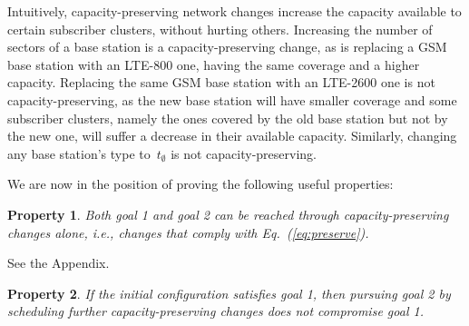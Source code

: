 \documentclass[10pt,journal,cspaper,compsoc]{IEEEtran}
\newcommand{\Eq}[1]{Eq.~(\ref{eq:#1})}
\newtheorem{property}{Property}
\begin{document}
Intuitively, capacity-preserving network changes increase the capacity available to certain subscriber clusters,
without hurting others. Increasing the number of sectors of a base station is a capacity-preserving change, as is
replacing a GSM base station with an LTE-800 one, having the same coverage and a higher capacity. Replacing the same
GSM base station with an LTE-2600 one is not capacity-preserving, as the new base station will have smaller coverage
and some subscriber clusters, namely the ones covered by the old base station but not by the new one, will suffer a
decrease in their available capacity. Similarly, changing any base station's type
to~$t_\emptyset$ is not capacity-preserving.

We are now in the position of proving the following useful properties:
\begin{property}
\label{prop:updates-enough}
Both goal 1 and goal 2 can be reached through capacity-preserving changes alone, i.e.,
changes that comply with \Eq{preserve}.
\end{property}
\begin{IEEEproof}
See the Appendix.
\end{IEEEproof}
\begin{property}
\label{prop:conflict12}
If the initial configuration satisfies goal 1, then pursuing goal 2 by scheduling further
capacity-preserving changes
does not compromise goal 1.
\end{property}
\end{document}
